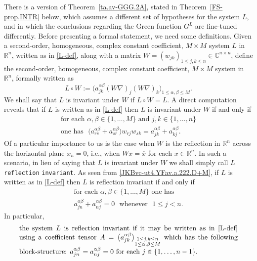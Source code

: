 \documentclass[11pt,reqno]{amsart}
\numberwithin{equation}{section}
\theoremstyle{remark}
\begin{document}
There is a version of Theorem~\ref{ta.av-GGG.2A}, stated in Theorem~\ref{FS-prop.INTR} below, which assumes a different 
set of hypotheses for the system $L$, and in which the conclusions regarding the Green function $G^L$ are fine-tuned differently. 
Before presenting a formal statement, we need some definitions. 
Given a second-order, homogeneous, complex constant coefficient, $M\times M$ system $L$ in ${\mathbb{R}}^n$, written as in \eqref{L-def},
along with a matrix $W=(w_{jk})_{1\leq j,k\leq n}\in{\mathbb{C}}^{n\times n}$, define the second-order, homogeneous, complex constant coefficient, $M\times M$ system in ${\mathbb{R}}^n$, formally written as 
%
\begin{equation}\label{eq:kfgdc.WACO.D+M.new}
L\circ W:=\Big(a_{jk}^{\alpha\beta}(W\nabla)_j(W\nabla)_k\Big)_{1\leq\alpha,\beta\leq M}.
\end{equation}
%
We shall say that $L$ is invariant under $W$ if $L\circ W=L$. A direct computation reveals 
that if $L$ is written as in \eqref{L-def} then $L$ is invariant under $W$ if and only if 
%
\begin{equation}\label{JKBvc-ut4.YFav.a.222.D+M}
\begin{array}{c}
\text{for each $\alpha,\beta\in\{1,\dots,M\}$ and $j,k\in\{1,\dots,n\}$} 
\\[0pt]
\text{one has }\,\,\big(a_{rs}^{\alpha\beta}+a_{sr}^{\alpha\beta}\big)w_{rj}w_{sk}=a_{jk}^{\alpha\beta}+a_{kj}^{\alpha\beta}. 
\end{array}
\end{equation}
%
Of a particular importance to us is the case when $W$ is the reflection in ${\mathbb{R}}^n$ across the horizontal plane $x_n=0$, 
i.e., when $Wx=\overline{x}$ for each $x\in{\mathbb{R}}^n$. In such a scenario, in lieu of saying that $L$ is invariant under $W$ 
we shall simply call $L$ {\tt reflection} {\tt invariant}. As seen from \eqref{JKBvc-ut4.YFav.a.222.D+M}, 
if $L$ is written as in \eqref{L-def} then $L$ is reflection invariant if and only if 
%
\begin{equation}\label{JKBvc-ut4.YFav.a.222}
\begin{array}{c}
\text{for each $\alpha,\beta\in\{1,\dots,M\}$ one has} 
\\[0pt]
a_{jn}^{\alpha\beta}+a_{nj}^{\alpha\beta}=0\,\,\text{ whenever }\,\,1\leq j<n. 
\end{array}
\end{equation}
%
In particular,
%
\begin{equation}\label{JKBvc-ut4.YFav.a.333}
\parbox{11.10cm}{the system $L$ is reflection invariant if it may be written as in \eqref{L-def} using a coefficient tensor 
$A=\big(a_{jk}^{\alpha\beta}\big)_{\substack{1\leq j,k\leq n\\ 1\leq\alpha,\beta\leq M}}$
which has the following block-structure: $a_{jn}^{\alpha\beta}=a_{nj}^{\alpha\beta}=0$ for each $j\in\{1,\dots,n-1\}$.}
\end{equation}
\end{document}
